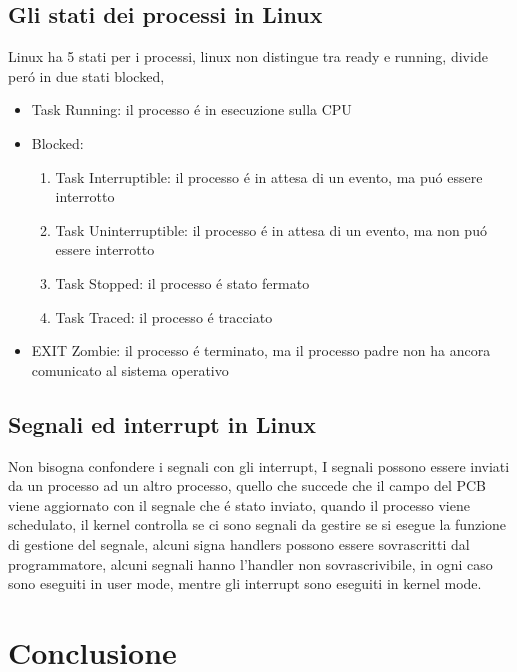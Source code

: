 \documentclass[11pt]{article}
\begin{document}
\subsection{Gli stati dei processi in Linux}
Linux ha 5 stati per i processi, linux non distingue tra ready e running, divide peró in due stati blocked,
\begin{itemize}
    \item Task Running: il processo é in esecuzione sulla CPU
    \item Blocked:
    \begin{enumerate}
        \item Task Interruptible: il processo é in attesa di un evento, ma puó essere interrotto
        \item Task Uninterruptible: il processo é in attesa di un evento, ma non puó essere interrotto
        \item Task Stopped: il processo é stato fermato
        \item Task Traced: il processo é tracciato
    \end{enumerate}
    \item EXIT Zombie: il processo é terminato, ma il processo padre non ha ancora comunicato al sistema operativo
    \end{itemize}
\subsection{Segnali ed interrupt in Linux}
Non bisogna confondere i segnali con gli interrupt, I segnali possono essere inviati da un processo ad un altro processo,
quello che succede che il campo del PCB viene aggiornato con il segnale che é stato inviato, quando il processo
viene schedulato, il kernel controlla se ci sono segnali da gestire se si esegue la funzione di gestione del segnale,
alcuni signa handlers possono essere sovrascritti dal programmatore, alcuni segnali hanno l'handler non sovrascrivibile,
in ogni caso sono eseguiti in user mode, mentre gli interrupt sono eseguiti in kernel mode.




\section{Conclusione}
\end{document}

